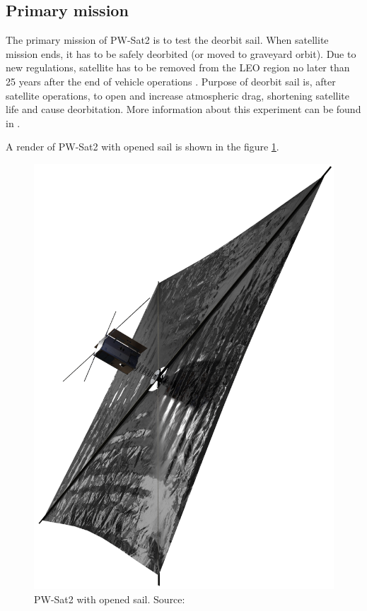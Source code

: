     \subsection{Primary mission}
        The primary mission of PW-Sat2 is to test the deorbit sail. When satellite mission ends, it has to be safely deorbited (or moved to graveyard orbit). Due to new regulations, satellite has to be removed from
        the LEO region no later than 25 years after the end of vehicle operations \cite{Satellite_disposal}. Purpose of deorbit sail is, after satellite operations, to open and increase atmospheric drag, shortening satellite life and cause deorbitation. More information about this experiment can be found in \cite{DDC_article}.

        A render of PW-Sat2 with opened sail is shown in the figure \ref{PW-Sat_render_sail}.

        \begin{figure}[H]
            \centering
            \includegraphics[width=0.38\paperwidth]{img/4/PW-Sat2_render_02.png}
            \caption{PW-Sat2 with opened sail. Source: \cite{PW_sat2_photo}}
            \label{PW-Sat_render_sail}
        \end{figure}

